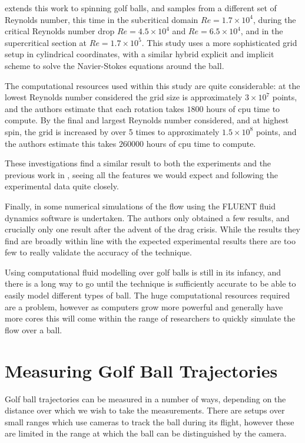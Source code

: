 \citet{Beratlis2012Numerical} extends this work to spinning golf balls, and samples from a different
set of Reynolds number, this time in the subcritical domain $Re = 1.7\times10^4$, during the critical
Reynolds number drop $Re = 4.5\times10^4$ and $Re = 6.5\times10^4$, and in the supercritical section
at $Re = 1.7\times10^5$. This study uses a more sophisticated grid setup in cylindrical coordinates,
with a similar hybrid explicit and implicit scheme to solve the Navier-Stokes equations around the ball.

The computational resources used within this study are quite considerable: at the lowest Reynolds 
number considered the grid size is approximately $3\times10^7$ points, and the authors estimate that each rotation
takes $1800$ hours of cpu time to compute. By the final and largest Reynolds number considered, and at 
highest spin, the grid is increased by over 5 times to approximately $1.5\times10^8$ points, 
and the authors estimate this
takes $260000$ hours of cpu time to compute.

These investigations find a similar result to both the experiments and the previous work in \citet{Smith2010},
seeing all the features we would expect and following the experimental data quite closely.

Finally, in \citet{Aoki2010} some numerical simulations of the flow using the FLUENT fluid dynamics
software is undertaken. The authors only obtained a few results, and crucially only one result after
the advent of the drag crisis. While the results they find are broadly within line with the expected
experimental results there are too few to really validate the accuracy of the technique.

Using computational fluid modelling over golf balls is still in its infancy, and there is a long way
to go until the technique is sufficiently accurate to be able to easily model different types of ball.
The huge computational resources required are a problem, however as computers grow more powerful and
generally have more cores this will come within the range of researchers to quickly simulate the flow
over a ball.

\section{Measuring Golf Ball Trajectories}

Golf ball trajectories can be measured in a number of ways, depending on the distance over which we
wish to take the measurements. There are setups over small ranges which use cameras to track the ball
during its flight, however these are limited in the range at which the ball can be distinguished by
the camera.

